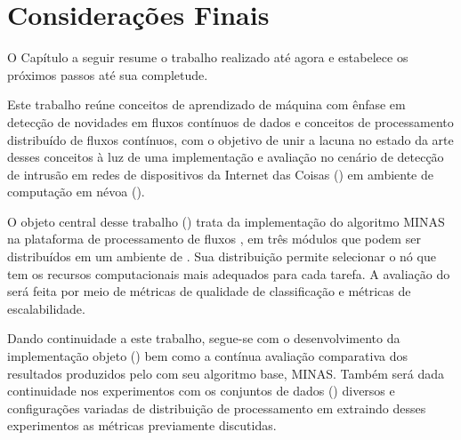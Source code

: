 \chapter{Considerações Finais}\label{cha:final}

\begin{resumocap}
  O Capítulo a seguir resume o trabalho realizado até agora e estabelece
  os próximos passos até sua completude.
\end{resumocap}

Este trabalho reúne conceitos de aprendizado de máquina com ênfase em detecção
de novidades em fluxos contínuos de dados e conceitos de processamento
distribuído de fluxos contínuos, com o objetivo de unir a lacuna no estado da
arte desses conceitos à luz de uma implementação e avaliação no cenário de
detecção de intrusão em redes de dispositivos da Internet das Coisas (\iot) em
ambiente de computação em névoa (\fog).

O objeto central desse trabalho (\mfog) trata da implementação do algoritmo MINAS na
plataforma de processamento de fluxos \flink, em três módulos que podem ser
distribuídos em um ambiente de \fog.
Sua distribuição permite selecionar o nó que tem os recursos computacionais mais
adequados para cada tarefa.
A avaliação do \mfog será feita por meio de métricas de qualidade de classificação
e métricas de escalabilidade.


Dando continuidade a este trabalho, segue-se com o desenvolvimento da implementação objeto
(\mfog) bem como a contínua avaliação comparativa dos resultados
produzidos pelo \mfog com seu algoritmo base, MINAS.
Também será dada continuidade nos experimentos com os conjuntos de dados (\datasets)
diversos e configurações variadas de distribuição de processamento em \fog
extraindo desses experimentos as métricas previamente discutidas.





